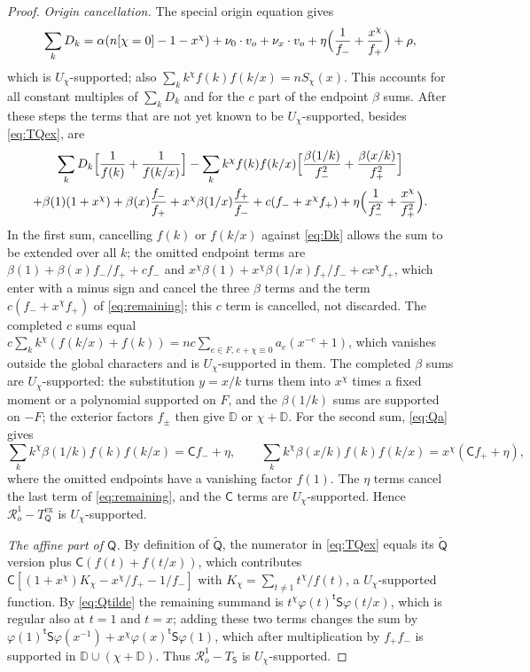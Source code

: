\documentclass{amsart}
\theoremstyle{definition}
\theoremstyle{remark}
\numberwithin{equation}{section}
\begin{document}
\begin{proof}
\emph{Origin cancellation.} The special origin equation gives
\[
  \sum_kD_k=\alpha(n[\chi=0]-1-x^\chi)+\nu_0\cdot v_o+\nu_x\cdot v_o
   +\eta\Bigl(\frac1{f_-}+\frac{x^\chi}{f_+}\Bigr)+\rho,
\]
which is $U_\chi$-supported; also $\sum_kk^\chi f(k)f(k/x)=nS_\chi(x)$. This accounts for all
constant multiples of $\sum_kD_k$ and for the $c$ part of the endpoint $\beta$ sums. After
these steps the terms that are not yet known to be $U_\chi$-supported, besides
\eqref{eq:TQex}, are
\begin{multline}\label{eq:remaining}
  \sum_kD_k\Bigl[\frac1{f(k)}+\frac1{f(k/x)}\Bigr]
   -\sum_kk^\chi f(k)f(k/x)\Bigl[\frac{\beta(1/k)}{f_-^2}+\frac{\beta(x/k)}{f_+^2}\Bigr]\\
   +\beta(1)(1+x^\chi)+\beta(x)\frac{f_-}{f_+}+x^\chi\beta(1/x)\frac{f_+}{f_-}
   +c(f_-+x^\chi f_+)+\eta\Bigl(\frac1{f_-^2}+\frac{x^\chi}{f_+^2}\Bigr).
\end{multline}
In the first sum, cancelling $f(k)$ or $f(k/x)$ against \eqref{eq:Dk} allows the sum to
be extended over all $k$; the omitted endpoint terms are
$\beta(1)+\beta(x)f_-/f_++cf_-$ and $x^\chi\beta(1)+x^\chi\beta(1/x)f_+/f_-+cx^\chi f_+$,
which enter with a minus sign and cancel the three $\beta$ terms and the term
$c(f_-+x^\chi f_+)$ of \eqref{eq:remaining}; this $c$ term is cancelled, not discarded. The completed $c$ sums equal
$c\sum_kk^\chi(f(k/x)+f(k))=nc\sum_{e\in F,\,e+\chi\equiv0}a_e(x^{-e}+1)$, which vanishes
outside the global characters and is $U_\chi$-supported in them. The completed $\beta$ sums are
$U_\chi$-supported: the substitution $y=x/k$ turns them into $x^\chi$ times a fixed moment or a
polynomial supported on $F$, and the $\beta(1/k)$ sums are supported on $-F$; the
exterior factors $f_\pm$ then give $\mathbb D$ or $\chi+\mathbb D$. For the second
sum, \eqref{eq:Qa} gives
\[
  \sum_kk^\chi\beta(1/k)f(k)f(k/x)=\mathsf Cf_-+\eta,\qquad
  \sum_kk^\chi\beta(x/k)f(k)f(k/x)=x^\chi(\mathsf Cf_++\eta),
\]
where the omitted endpoints have a vanishing factor $f(1)$. The $\eta$ terms cancel
the last term of \eqref{eq:remaining}, and the $\mathsf C$ terms are $U_\chi$-supported. Hence
$\mathcal R^1_o-T^{\mathrm{ex}}_{\mathsf Q}$ is $U_\chi$-supported.

\emph{The affine part of $\mathsf Q$.} By definition of $\tilde{\mathsf Q}$, the
numerator in \eqref{eq:TQex} equals its $\tilde{\mathsf Q}$ version plus
$\mathsf C(f(t)+f(t/x))$, which contributes
$\mathsf C[(1+x^\chi)K_\chi-x^\chi/f_+-1/f_-]$ with $K_\chi=\sum_{t\ne1}t^\chi/f(t)$, a
$U_\chi$-supported function. By \eqref{eq:Qtilde} the remaining summand is
$t^\chi\varphi(t)^{\mathsf t}\mathsf S\varphi(t/x)$, which is regular also at $t=1$ and
$t=x$; adding these two terms changes the sum by
$\varphi(1)^{\mathsf t}\mathsf S\varphi(x^{-1})+x^\chi\varphi(x)^{\mathsf t}\mathsf S
\varphi(1)$, which after multiplication by $f_+f_-$ is supported in $\mathbb D\cup
(\chi+\mathbb D)$. Thus $\mathcal R^1_o-T_{\mathsf S}$ is $U_\chi$-supported.


\end{proof}
\end{document}
